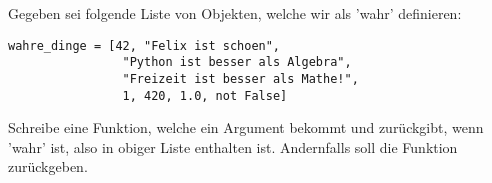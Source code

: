 \begin{aufg}
  Gegeben sei folgende Liste von Objekten, welche wir als 'wahr'
  definieren:
  \begin{lstlisting}
wahre_dinge = [42, "Felix ist schoen", 
                "Python ist besser als Algebra",
                "Freizeit ist besser als Mathe!", 
                1, 420, 1.0, not False]
  \end{lstlisting}
  Schreibe eine Funktion, welche ein Argument  bekommt und 
  zurückgibt, wenn  'wahr' ist, also in obiger Liste enthalten ist.
  Andernfalls soll die Funktion  zurückgeben.
\end{aufg}
